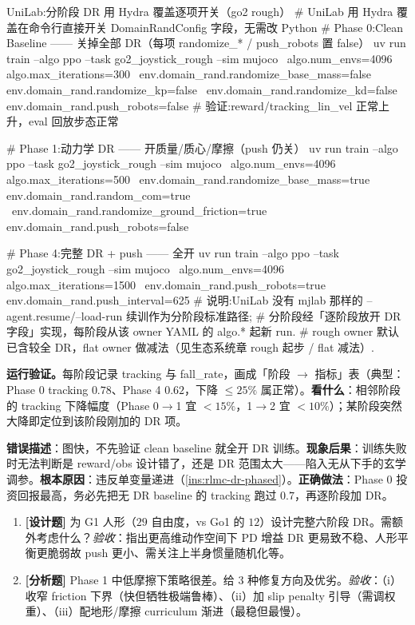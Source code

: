 \begin{codebox}[bash]{UniLab:分阶段 DR 用 Hydra 覆盖逐项开关（go2 rough）}
# UniLab 用 Hydra 覆盖在命令行直接开关 DomainRandConfig 字段，无需改 Python
# Phase 0:Clean Baseline —— 关掉全部 DR（每项 randomize_* / push_robots 置 false）
uv run train --algo ppo --task go2_joystick_rough --sim mujoco \
    algo.num_envs=4096 algo.max_iterations=300 \
    env.domain_rand.randomize_base_mass=false env.domain_rand.randomize_kp=false \
    env.domain_rand.randomize_kd=false env.domain_rand.push_robots=false
# 验证:reward/tracking_lin_vel 正常上升，eval 回放步态正常

# Phase 1:动力学 DR —— 开质量/质心/摩擦（push 仍关）
uv run train --algo ppo --task go2_joystick_rough --sim mujoco \
    algo.num_envs=4096 algo.max_iterations=500 \
    env.domain_rand.randomize_base_mass=true env.domain_rand.random_com=true \
    env.domain_rand.randomize_ground_friction=true env.domain_rand.push_robots=false

# Phase 4:完整 DR + push —— 全开
uv run train --algo ppo --task go2_joystick_rough --sim mujoco \
    algo.num_envs=4096 algo.max_iterations=1500 \
    env.domain_rand.push_robots=true env.domain_rand.push_interval=625
# 说明:UniLab 没有 mjlab 那样的 --agent.resume/--load-run 续训作为分阶段标准路径;
#   分阶段经「逐阶段放开 DR 字段」实现，每阶段从该 owner YAML 的 algo.* 起新 run.
#   rough owner 默认已含较全 DR，flat owner 做减法（见生态系统章 rough 起步 / flat 减法）.
\end{codebox}

\textbf{运行验证。}每阶段记录 tracking 与 fall\_rate，画成「阶段 $\to$ 指标」表（典型：Phase 0 tracking $0.78$、Phase 4 $0.62$，下降 $\le 25\%$ 属正常）。\textbf{看什么}：相邻阶段的 tracking 下降幅度（Phase 0$\to$1 宜 $<15\%$，1$\to$2 宜 $<10\%$）；某阶段突然大降即定位到该阶段刚加的 DR 项。

\begin{pitfall}[跳过 Phase 0 直接从 Phase 4 开始]
\textbf{错误描述}：图快，不先验证 clean baseline 就全开 DR 训练。\textbf{现象后果}：训练失败时无法判断是 reward/obs 设计错了，还是 DR 范围太大——陷入无从下手的玄学调参。\textbf{根本原因}：违反单变量递进（\cref{ins:rlmc-dr-phased}）。\textbf{正确做法}：Phase 0 投资回报最高，务必先把无 DR baseline 的 tracking 跑过 $0.7$，再逐阶段加 DR。
\end{pitfall}

\begin{practice}[本节练习]
\begin{enumerate}
  \item \textbf{[设计题]} 为 G1 人形（$29$ 自由度，vs Go1 的 $12$）设计完整六阶段 DR。需额外考虑什么？\emph{验收}：指出更高维动作空间下 PD 增益 DR 更易致不稳、人形平衡更脆弱故 push 更小、需关注上半身惯量随机化等。
  \item \textbf{[分析题]} Phase 1 中低摩擦下策略很差。给 3 种修复方向及优劣。\emph{验收}：（i）收窄 friction 下界（快但牺牲极端鲁棒）、（ii）加 slip penalty 引导（需调权重）、（iii）配地形/摩擦 curriculum 渐进（最稳但最慢）。
\end{enumerate}
\end{practice}

